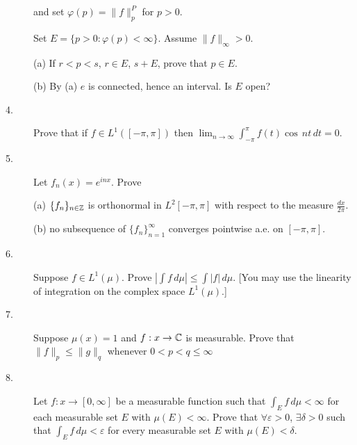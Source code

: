 \documentclass[bbb]{report}
\def\ds{\displaystyle}
\def\Z{{\Bbb Z}}
\def\C{{\Bbb C}}
\begin{document}
\begin{large}
\begin{description}
and set $\varphi(p) = \|f\|^P_p$ for $p>0.$

Set $E=\{ p>0: \varphi(p) < \infty \}$. Assume $\|f\|_\infty > 0$.

\item[\quad] (a)
If $r<p<s$, $r\in E$, $s+E$, prove that $p\in E$.

\item[\quad] (b)
By (a) $e$ is connected, hence an interval. Is $E$ open?


\vspace{.05in}

\item[4.]
Prove that if $f\in L^1([-\pi,\pi])$
then $\ds\lim_{n\to\infty} \ds\int^\pi_{-\pi} f(t) \cos\,nt\,dt =0$.


\vspace{.05in}


\item[5.]
Let $f_n(x)=e^{inx}$. Prove

\item[\quad] (a)
$\{f_n\}_{n\in\Z}$ is orthonormal in $L^2[-\pi,\pi]$ with
respect to the measure $\ds\frac{dx}{2\pi}$.

\item[\quad] (b)
no subsequence of $\{f_n\}^\infty_{n=1} $
converges pointwise a.e. on $[-\pi,\pi]$.


\vspace{.05in}

\item[6.]
Suppose $f\in L^1(\mu)$.
Prove $|\ds\int f\,d\mu| \leq \ds\int |f|\,d\mu$.
[You may use the linearity of integration on the complex space
$L^1(\mu)$.]

\vspace{.05in}

\item[7.]
Suppose $\mu(x)=1$ and $f:x\to\C$ is measurable. Prove that
$\|f\|_p \leq \|g\|_q$ whenever $0 < p < q \leq \infty$

\vspace{.05in}

\item[8.]
Let $f:x\to [0,\infty]$ be a measurable function such that
$\ds\int_E f\,d\mu < \infty$ for each measurable set $E$ with
$\mu(E) < \infty$.
Prove that $\forall \varepsilon > 0$, $\exists \delta > 0$
such that $\ds\int_E f\,d\mu < \varepsilon$
for every measurable set $E$ with $\mu(E) < \delta$.

\vfill

\end{description}

\end{large}
\end{document}
